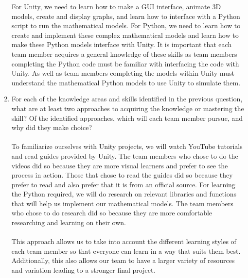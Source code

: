 \documentclass[12pt]{article}
\begin{document}
\begin{enumerate}
  For Unity, we need to learn how to make a GUI interface, animate 3D models, create and display graphs, and learn how to interface with a Python script to run the mathematical models.
  For Python, we need to learn how to create and implement these complex mathematical models and learn how to make these Python models interface with Unity.
  It is important that each team member acquires a general knowledge of these skills as team members completing the Python code must be familiar with interfacing the code with Unity. 
  As well as team members completing the models within Unity must understand the mathematical Python models to use Unity to simulate them. 
  \item For each of the knowledge areas and skills identified in the previous
  question, what are at least two approaches to acquiring the knowledge or
  mastering the skill?  Of the identified approaches, which will each team
  member pursue, and why did they make  choice?
  \\\\
  To familiarize ourselves with Unity projects, we will watch YouTube tutorials and read guides provided by Unity.
  The team members who chose to do the videos did so because they are more visual learners and prefer to see the process in action.
  Those that chose to read the guides did so because they prefer to read and also prefer that it is from an official source.
  For learning the Python required, we will do research on relevant libraries and functions that will help us implement our mathematical models.
  The team members who chose to do research did so because they are more comfortable researching and learning on their own.
  \\\\
  This approach allows us to take into account the different learning styles of each team member so that everyone can learn in a way that suits them best. 
  Additionally, this also allows our team to have a larger variety of resources and variation leading to a stronger final project.

\end{enumerate}
\end{document}
